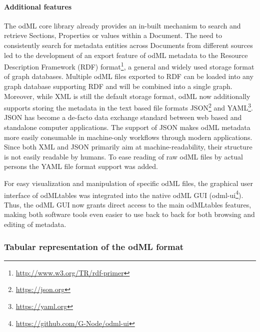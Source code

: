 \paragraph{Additional features}
The odML core library already provides an in-built mechanism to search and retrieve Sections, Properties or values within a Document. The need to consistently search for metadata entities across Documents from different sources led to the development of an export feature of odML metadata to the Resource Description Framework (RDF) format\footnote{\url{http://www.w3.org/TR/rdf-primer}}, a general and widely used storage format of graph databases. Multiple odML files exported to RDF can be loaded into any graph database supporting RDF and will be combined into a single graph. Moreover, while XML is still the default storage format, odML now additionally supports storing the metadata in the text based file formats JSON\footnote{\url{https://json.org}} and YAML\footnote{\url{https://yaml.org}}. JSON has become a de-facto data exchange standard between web based and standalone computer applications. The support of JSON makes odML metadata more easily consumable in machine-only workflows through modern applications. Since both XML and JSON primarily aim at machine-readability, their structure is not easily readable by humans. To ease reading of raw odML files by actual persons the YAML file format support was added.

For easy visualization and manipulation of specific odML files, the graphical user interface of odMLtables was integrated into the native odML GUI (odml-ui\footnote{\url{https://github.com/G-Node/odml-ui}}). Thus, the odML GUI now grants direct access to the main odMLtables features, making both software tools even easier to use back to back for both browsing and editing of metadata.

\subsubsection{Tabular representation of the odML format} 
\label{sec:tabular_format}

